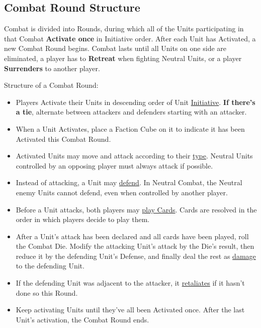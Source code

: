 \begin{multicols}{2}

\subsection*{Combat Round Structure}
Combat is divided into Rounds, during which all of the Units participating in that Combat \textbf{Activate once} in Initiative order.
After each Unit has Activated, a new Combat Round begins.
Combat lasts until all Units on one side are eliminated, a player has to \textbf{Retreat} when fighting Neutral Units, or a player \textbf{Surrenders} to another player.

Structure of a Combat Round:
\begin{itemize}
  \item Players Activate their Units in descending order of Unit \hyperlink{Initiative}{Initiative}. \textbf{If there's a tie}, alternate between attackers and defenders starting with an attacker.
  \item When a Unit Activates, place a Faction Cube on it to indicate it has been Activated this Combat Round.
  \item Activated Units may move and attack according to their \hyperlink{Unittype}{type}. Neutral Units controlled by an opposing player must always attack if possible.
  \item Instead of attacking, a Unit may \hyperlink{Defend}{defend}.
  In Neutral Combat, the Neutral enemy Units cannot defend, even when controlled by another player.
  \item Before a Unit attacks, both players may \hyperlink{CombatCards}{play Cards}. Cards are resolved in the order in which players decide to play them.
  \item After a Unit's attack has been declared and all cards have been played, roll the Combat Die.
    Modify the attacking Unit's attack by the Die's result, then reduce it by the defending Unit's Defense, and finally deal the rest as \hyperlink{HP}{damage} to the defending Unit.
  \item If the defending Unit was adjacent to the attacker, it \hyperlink{Retaliate}{retaliates} if it hasn't done so this Round.
  \item Keep activating Units until they've all been Activated once.
After the last Unit's activation, the Combat Round ends.
\end{itemize}


\end{multicols}
